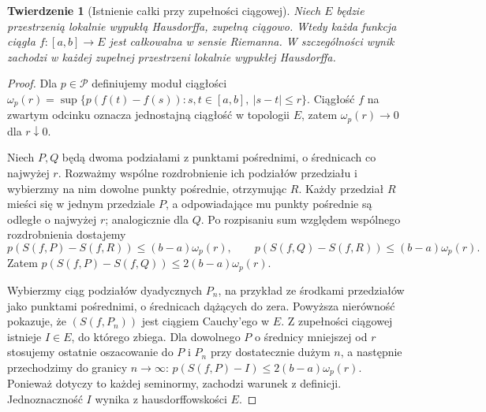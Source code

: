 \documentclass[11pt,a4paper]{article}
\numberwithin{equation}{section}
\theoremstyle{plain}
\newtheorem{twierdzenie}{Twierdzenie}[section]
\theoremstyle{definition}
\theoremstyle{remark}
\begin{document}
\begin{twierdzenie}[Istnienie całki przy zupełności ciągowej]
\label{thm:riemann-existence15a}
Niech $E$ będzie przestrzenią lokalnie wypukłą Hausdorffa,
zupełną ciągowo. Wtedy każda funkcja ciągła $f:[a,b]\to E$
jest całkowalna w sensie Riemanna. W szczególności wynik
zachodzi w każdej zupełnej przestrzeni lokalnie wypukłej Hausdorffa.
\end{twierdzenie}
\begin{proof}
Dla $p\in\mathcal P$ definiujemy moduł ciągłości
$\omega_p(r)=\sup\{p(f(t)-f(s)):s,t\in[a,b],\ |s-t|\le r\}$.
Ciągłość $f$ na zwartym odcinku oznacza jednostajną ciągłość
w topologii $E$, zatem $\omega_p(r)\to0$ dla $r\downarrow0$.

Niech $P,Q$ będą dwoma podziałami z punktami pośrednimi, o średnicach
co najwyżej $r$. Rozważmy wspólne rozdrobnienie ich podziałów
przedziału i wybierzmy na nim dowolne punkty pośrednie, otrzymując $R$.
Każdy przedział $R$ mieści się w jednym przedziale $P$, a odpowiadające
mu punkty pośrednie są odległe o najwyżej $r$; analogicznie dla $Q$.
Po rozpisaniu sum względem wspólnego rozdrobnienia dostajemy
\[
 p(S(f,P)-S(f,R))\le(b-a)\omega_p(r),\qquad
 p(S(f,Q)-S(f,R))\le(b-a)\omega_p(r).
\]
Zatem $p(S(f,P)-S(f,Q))\le2(b-a)\omega_p(r)$.

Wybierzmy ciąg podziałów dyadycznych $P_n$, na przykład ze środkami
przedziałów jako punktami pośrednimi, o średnicach dążących do zera.
Powyższa nierówność pokazuje, że $(S(f,P_n))$ jest ciągiem Cauchy'ego
w $E$. Z zupełności ciągowej istnieje $I\in E$, do którego zbiega.
Dla dowolnego $P$ o średnicy mniejszej od $r$ stosujemy ostatnie
oszacowanie do $P$ i $P_n$ przy dostatecznie dużym $n$, a następnie
przechodzimy do granicy $n\to\infty$:
$p(S(f,P)-I)\le2(b-a)\omega_p(r)$.
Ponieważ dotyczy to każdej seminormy, zachodzi warunek z definicji.
Jednoznaczność $I$ wynika z hausdorffowskości $E$.
\end{proof}
\end{document}

